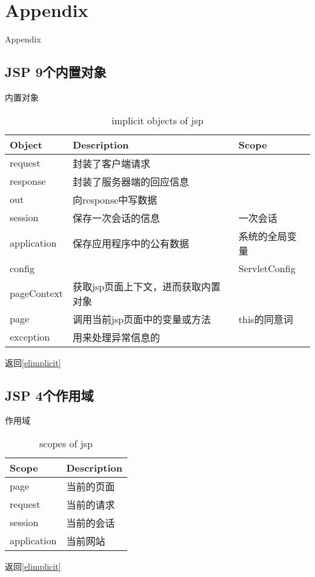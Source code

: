 \documentclass{beamer}
\begin{document}
\section{Appendix}

\begin{frame}
\Huge{\centerline{Appendix}}
\end{frame}

\subsection{JSP 9个内置对象}
\begin{frame}{内置对象}
\label{implicitobj}
\begin{table}
\begin{tabular}{lll}
\toprule
\textbf{Object}&\textbf{Description}&\textbf{Scope}\\
\midrule
request&封装了客户端请求&\\
response&封装了服务器端的回应信息&\\
out&向response中写数据&\\
session&保存一次会话的信息&一次会话\\
application&保存应用程序中的公有数据&系统的全局变量\\
config&&ServletConfig\\
pageContext&获取jsp页面上下文，进而获取内置对象&\\
page&调用当前jsp页面中的变量或方法&this的同意词\\
exception&用来处理异常信息的&\\
\bottomrule
\end{tabular}
\caption{implicit objects of jsp}

\end{table}
返回\ref{elimplicit}
\end{frame}
\subsection{JSP 4个作用域}
\begin{frame}{作用域}
\begin{table}
\label{scope}
\begin{tabular}{ll}
\toprule
\textbf{Scope}&\textbf{Description}\\
\midrule
page&当前的页面\\
request&当前的请求\\
session&当前的会话\\
application&当前网站\\
\bottomrule
\end{tabular}
\caption{scopes of jsp}
\end{table}
返回\ref{elimplicit}
\end{frame}
\end{document}
